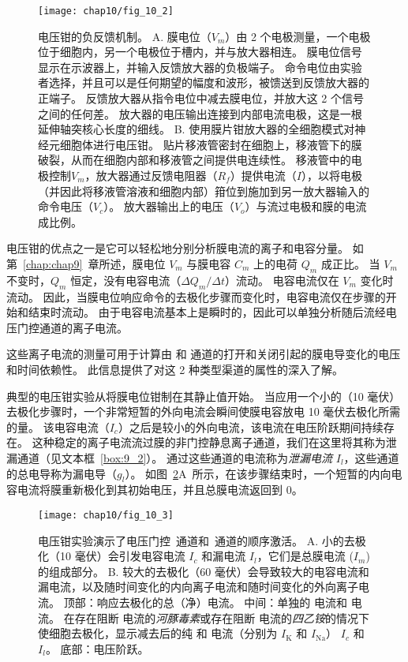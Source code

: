 \begin{figure}[htbp]
	\centering
	\texttt{[image: chap10/fig\_10\_2]}
	\caption{电压钳的负反馈机制。
	A. 膜电位（$V_m$）由 2 个电极测量，一个电极位于细胞内，另一个电极位于槽内，并与放大器相连。
	膜电位信号显示在示波器上，并输入反馈放大器的负极端子。
	命令电位由实验者选择，并且可以是任何期望的幅度和波形，被馈送到反馈放大器的正端子。
	反馈放大器从指令电位中减去膜电位，并放大这 2 个信号之间的任何差。
	放大器的电压输出连接到内部电流电极，这是一根延伸轴突核心长度的细线。
	B. 使用膜片钳放大器的全细胞模式对神经元细胞体进行电压钳。
	贴片移液管密封在细胞上，移液管下的膜破裂，从而在细胞内部和移液管之间提供电连续性。
	移液管中的电极控制$V_m$，放大器通过反馈电阻器（$R_f$）提供电流（$I$），以将电极（并因此将移液管溶液和细胞内部）箝位到施加到另一放大器输入的命令电压（$V_c$）。
	放大器输出上的电压（$V_o$）与流过电极和膜的电流成比例。}
	\label{fig:10_2}
\end{figure}



电压钳的优点之一是它可以轻松地分别分析膜电流的离子和电容分量。
如第~\ref{chap:chap9}~章所述，膜电位 $V_m$ 与膜电容 $C_m$ 上的电荷 $Q_m$ 成正比。
当 $V_m$ 不变时，$Q_m$ 恒定，没有电容电流（$\Delta Q_m / \Delta t）$流动。
电容电流仅在 $V_m$ 变化时流动。
因此，当膜电位响应命令的去极化步骤而变化时，电容电流仅在步骤的开始和结束时流动。
由于电容电流基本上是瞬时的，因此可以单独分析随后流经电压门控通道的离子电流。


这些离子电流的测量可用于计算由  和  通道的打开和关闭引起的膜电导变化的电压和时间依赖性。
此信息提供了对这 2 种类型渠道的属性的深入了解。


典型的电压钳实验从将膜电位钳制在其静止值开始。
当应用一个小的（10 毫伏）去极化步骤时，一个非常短暂的外向电流会瞬间使膜电容放电 10 毫伏去极化所需的量。
该电容电流（$I_c$）之后是较小的外向电流，该电流在电压阶跃期间持续存在。
这种稳定的离子电流流过膜的非门控静息离子通道，我们在这里将其称为泄漏通道（见文本框~\ref{box:9_2}）。
通过这些通道的电流称为\textit{泄漏电流} $I_l$，这些通道的总电导称为漏电导（$g_l$）。
如图~\ref{fig:10_3}A~所示，在该步骤结束时，一个短暂的内向电容电流将膜重新极化到其初始电压，并且总膜电流返回到 0。


\begin{figure}[htbp]
	\centering
	\texttt{[image: chap10/fig\_10\_3]}
	\caption{电压钳实验演示了电压门控~通道和~通道的顺序激活。
		A. 小的去极化（10 毫伏）会引发电容电流 $I_c$ 和漏电流 $I_l$，它们是总膜电流 ($I_m$) 的组成部分。
		B. 较大的去极化（60 毫伏）会导致较大的电容电流和漏电流，以及随时间变化的内向离子电流和随时间变化的外向离子电流。
		顶部：响应去极化的总（净）电流。
		中间：单独的  电流和  电流。
		在存在阻断  电流的\textit{河豚毒素}或存在阻断  电流的\textit{四乙铵}的情况下使细胞去极化，显示减去后的纯  和  电流（分别为 $I_\text{K}$ 和 $I_\text{Na}$） $I_c$ 和 $I_l$。
		底部：电压阶跃。}
	\label{fig:10_3}
\end{figure}


